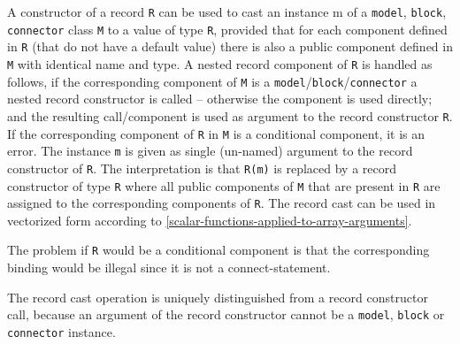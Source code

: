 A constructor of a record \lstinline!R! can be used to cast an instance m of a
\lstinline!model!, \lstinline!block!, \lstinline!connector! class \lstinline!M! to a value of type \lstinline!R!, provided that for
each component defined in \lstinline!R! (that do not have a default value) there is
also a public component defined in \lstinline!M! with identical name and type. A
nested record component of \lstinline!R! is handled as follows, if the corresponding
component of \lstinline!M! is a \lstinline!model!/\lstinline!block!/\lstinline!connector! a nested record constructor is
called -- otherwise the component is used directly; and the resulting
call/component is used as argument to the record constructor \lstinline!R!. If the
corresponding component of \lstinline!R! in \lstinline!M! is a conditional component, it is an
error. The instance \lstinline!m! is given as single (un-named)
argument to the record constructor of \lstinline!R!. The interpretation is that \lstinline!R(m)!
is replaced by a record constructor of type \lstinline!R! where all public
components of \lstinline!M! that are present in \lstinline!R! are assigned to the corresponding
components of \lstinline!R!. The record cast can be used in vectorized form
according to \cref{scalar-functions-applied-to-array-arguments}.

\begin{nonnormative}
The problem if \lstinline!R! would be a conditional component is that the corresponding binding would be illegal since it is not a
connect-statement.
\end{nonnormative}

\begin{nonnormative}
The record cast operation is uniquely distinguished from a record constructor call, because an argument of the record constructor cannot
be a \lstinline!model!, \lstinline!block! or \lstinline!connector! instance.
\end{nonnormative}

